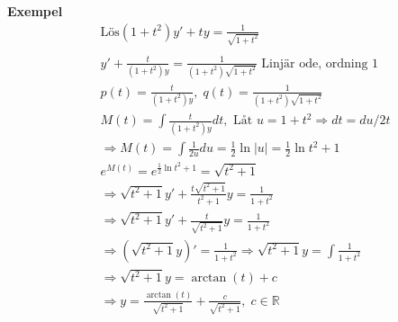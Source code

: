 \textbf{Exempel} 
\begin{align*}
  &\quad  \text{Lös} (1+t^2)y' + ty = \frac{1}{\sqrt{1+t^2}} \\
  &\quad  \\
  &\quad  y'+\frac{t}{(1+t^2)y} = \frac{1}{(1+t^2)\sqrt{1+t^2}} \text{ Linjär ode, ordning 1} \\
  &\quad  p(t)=\frac{t}{(1+t^2)y}, \; q(t)=\frac{1}{(1+t^2)\sqrt{1+t^2}} \\
  &\quad  M(t) = \int \frac{t}{(1+t^2)y}dt, \text{ Låt } u=1+t^2 \Rightarrow dt = du/2t \\
  &\quad  \Rightarrow M(t)=\int\frac{1}{2u}du = \frac{1}{2}\ln{|u|} = \frac{1}{2}\ln{t^2+1} \\
  &\quad  e^{M(t)}=e^{\frac{1}{2}\ln{t^2+1}}=\sqrt{t^2+1} \\
  &\quad  \Rightarrow \sqrt{t^2+1}y'+\frac{t\sqrt{t^2+1}}{t^2+1}y = \frac{1}{1+t^2} \\
  &\quad  \Rightarrow \sqrt{t^2+1}y'+\frac{t}{\sqrt{t^2+1}}y = \frac{1}{1+t^2} \\
  &\quad  \Rightarrow (\sqrt{t^2+1}y)' = \frac{1}{1+t^2} \Rightarrow \sqrt{t^2+1}y = \int\frac{1}{1+t^2} \\
  &\quad  \Rightarrow \sqrt{t^2+1}y = \arctan{(t)} +c \\
  &\quad  \Rightarrow y = \frac{\arctan{(t)}}{\sqrt{t^2+1}} +\frac{c}{{\sqrt{t^2+1}}}, \; c\in\mathbb{R} \\
\end{align*}




